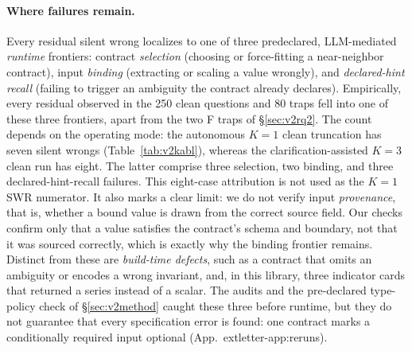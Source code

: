\documentclass[sigconf]{acmart}
\newcommand{\vqAbstainAll}{8}
\newcommand{\vqSelAccAll}{96.7\%}
\newcommand{\vqSWRAll}{3.2\%}
\newcommand{\vqtAbstainAll}{12}
\newcommand{\vqtSWRAll}{1.2\%}
\newcommand{\vqtSelAccAll}{98.7\%}
\newif\ifarxiv
\newcommand{\extref}[1]{App.~\ifarxiv\ref{#1}\else\csname extletter-#1\endcsname\fi}
\begin{document}
\paragraph{Where failures remain.}
Every residual silent wrong localizes to one of three predeclared, LLM-mediated \emph{runtime} frontiers: contract \emph{selection} (choosing or force-fitting a near-neighbor contract), input \emph{binding} (extracting or scaling a value wrongly), and \emph{declared-hint recall} (failing to trigger an ambiguity the contract already declares).
Empirically, every residual observed in the 250 clean questions and 80 traps fell into one of these three frontiers, apart from the two F traps of \S\ref{sec:v2rq2}. The count depends on the operating mode: the autonomous $K{=}1$ clean truncation has seven silent wrongs (Table~\ref{tab:v2kabl}), whereas the clarification-assisted $K{=}3$ clean run has eight. The latter comprise three selection, two binding, and three declared-hint-recall failures. This eight-case attribution is not used as the $K{=}1$ SWR numerator.
It also marks a clear limit: we do not verify input \emph{provenance}, that is, whether a bound value is drawn from the correct source field. Our checks confirm only that a value satisfies the contract's schema and boundary, not that it was sourced correctly, which is exactly why the binding frontier remains.
Distinct from these are \emph{build-time defects}, such as a contract that omits an ambiguity or encodes a wrong invariant, and, in this library, three indicator cards that returned a series instead of a scalar. The audits and the pre-declared type-policy check of \S\ref{sec:v2method} caught these three before runtime, but they do not guarantee that every specification error is found: one contract marks a conditionally required input optional (\extref{app:reruns}).
\end{document}
